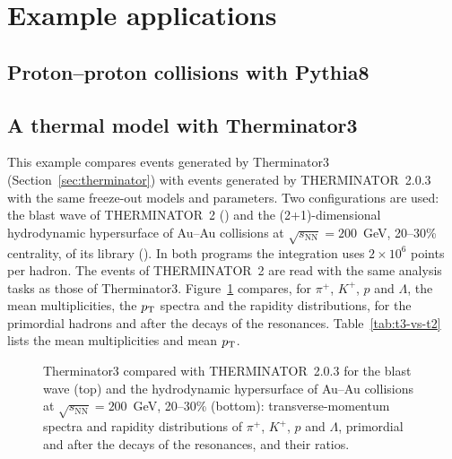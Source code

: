 \section{Example applications}
\label{sec:examples}

\subsection{Proton--proton collisions with Pythia8}
\label{sec:example-pythia}


\subsection{A thermal model with Therminator3}
\label{sec:example-therminator}

This example compares events generated by Therminator3 (Section~\ref{sec:therminator}) with events generated by
THERMINATOR~2.0.3~\cite{Chojnacki:2011hb} with the same freeze-out models and parameters. Two configurations are used:
the blast wave of THERMINATOR~2 () and the (2+1)-dimensional hydrodynamic hypersurface of
Au--Au collisions at $\sqrt{s_{\mathrm{NN}}} = 200$~GeV, 20--30\% centrality, of its library
(). In both programs the integration uses $2\times10^6$ points per hadron.
The events of THERMINATOR~2 are read with the same analysis tasks as those of Therminator3. Figure~\ref{fig:t3-vs-t2}
compares, for $\pi^+$, $K^+$, $p$ and $\Lambda$, the mean multiplicities, the $p_{\mathrm{T}}$ spectra and the rapidity
distributions, for the primordial hadrons and after the decays of the resonances. Table~\ref{tab:t3-vs-t2} lists the
mean multiplicities and mean $p_{\mathrm{T}}$.


\begin{figure}[t]
  \centering
  \caption{Therminator3 compared with THERMINATOR~2.0.3 for the blast wave (top) and the hydrodynamic hypersurface of
  Au--Au collisions at $\sqrt{s_{\mathrm{NN}}} = 200$~GeV, 20--30\% (bottom): transverse-momentum spectra and rapidity
  distributions of $\pi^+$, $K^+$, $p$ and $\Lambda$, primordial and after the decays of the resonances, and their
  ratios. }
  \label{fig:t3-vs-t2}
\end{figure}

